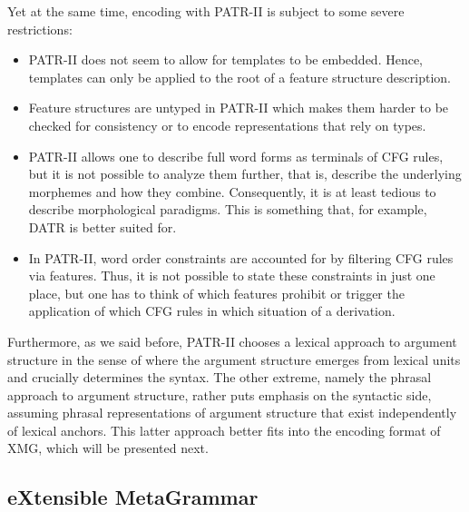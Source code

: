 \documentclass[output=paper]{langsci/langscibook}
\begin{document}
Yet at the same time, encoding with PATR-II is subject to some severe restrictions:
\begin{itemize}
\item PATR-II does not seem to allow for templates to be embedded. Hence, templates can only be applied to the root of a feature structure description. 
\item Feature structures are untyped in PATR-II which makes them harder to be checked for consistency or to encode representations that rely on types. 
\item PATR-II allows one to describe full word forms as terminals of CFG rules, but it is not possible to analyze them further, that is, describe the underlying morphemes and how they combine. Consequently, it is at least tedious to describe morphological paradigms. This is something that, for example, DATR \citep{evans:gazdar:96} is better suited for.
\item In PATR-II, word order constraints are accounted for by filtering CFG rules via features. Thus, it is not possible to state these constraints in just one place, but one has to think of which features prohibit or trigger the application of which CFG rules in which situation of a derivation.
\end{itemize}
Furthermore, as we said before, PATR-II chooses a lexical approach to argument structure in the sense of \cite{mueller:wechsler:14} where the argument structure emerges from lexical units and crucially determines the syntax. The other extreme, namely the phrasal approach to argument structure, rather puts emphasis on the syntactic side, assuming phrasal representations of argument structure that exist independently of lexical anchors. This latter approach better fits into the encoding format of XMG, which will be presented next. 


%
\subsection{eXtensible MetaGrammar}
\label{lic:sec:xmg}
\end{document}
